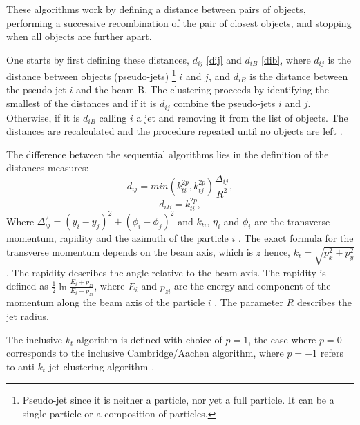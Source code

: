 These algorithms work by defining a distance between pairs of objects, performing a successive recombination of the pair of closest objects, and stopping when all objects are further apart. 

One starts by first defining these distances, $d_{ij}$ \eqref{dij} and $d_{iB}$ \eqref{dib}, where $d_{ij}$ is the distance between objects (pseudo-jets) \footnote{Pseudo-jet since it is neither a particle, nor yet a full particle. It can be a single particle or a composition of particles.} $i$ and $j$, and $d_{iB}$ is the distance between the pseudo-jet $i$ and the beam B. The clustering proceeds by identifying the smallest of the distances and if it is $d_{ij}$ combine the pseudo-jets $i$ and $j$. Otherwise, if it is $d_{iB}$ calling $i$ a jet and removing it from the list of objects. The distances are recalculated and the procedure repeated until no objects are left \citep{Cacciari:2008gp}. 


The difference between the sequential algorithms lies in the definition of the distances measures:
\begin{equation}
d_{ij} = min(k_{ti}^{2p}, k_{tj}^{2p}) \frac{\Delta_{ij}}{R^{2}},
\label{dij}\end{equation}         
\begin{equation}
d_{iB} = k_{ti}^{2p} ,
\label{dib}\end{equation}
Where $\Delta_{ij}^{2} = (y_{i} - y_{j})^2 + (\phi_{i} - \phi_{j})^2$ and $k_{ti}$, $\eta_{i}$ and $\phi_{i}$ are the transverse momentum, rapidity and  the azimuth of the particle $i$ \citep{Cacciari:2008gp}. The exact formula for the transverse momentum depends on the beam axis, which is $z$ hence, $k_{t} = \sqrt{p_x^2 + p_y^2}$. The rapidity describes the angle relative to the beam axis.
The rapidity is defined as $\frac{1}{2} \ln \frac{E_i + p_{zi}}{E_i - p_{zi}}$, where  $E_i$ and $p_{zi}$ are the energy and component of the momentum along the beam axis of the particle $i$ \citep{Cacciari:2011ma}. The parameter $R$ describes the jet radius. 

The inclusive $k_t$ algorithm is defined with choice of $p = 1$, the case where $p = 0$  corresponds to the inclusive Cambridge/Aachen algorithm, where $p = -1$ refers to anti-$k_t$ jet clustering algorithm \citep{Cacciari:2008gp}.

